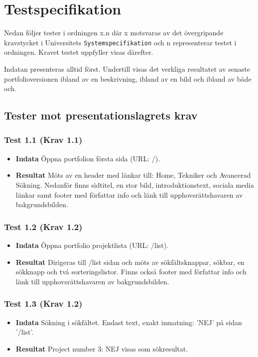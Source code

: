 \documentclass{TDP003mall}
\begin{document}
\section{Testspecifikation}
Nedan följer tester i ordningen x.n där x motsvaras av det övergripande kravstycket i Universitets \texttt{Systemspecifikation} och n representerar testet i ordningen. Kravet testet uppfyller visas därefter.

Indatan presenteras alltid först. Undertill visas det verkliga resultatet av senaste portfolioversionen ibland av en beskrivning, ibland av en bild och ibland av både och.
\subsection{Tester mot presentationslagrets krav}
\subsubsection*{Test 1.1 (Krav 1.1)}
\begin{itemize}
\item[]\textbf{Indata} Öppna portfolion första sida (URL: /).
\item[]\textbf{Resultat} Möts av en header med länkar till: Home, Tekniker och Avancerad Sökning. Nedanför finns sidtitel, en stor bild, introduktionstext, sociala media länkar samt footer med författar info och länk till upphovsrättshavaren av bakgrundsbilden.
\end{itemize}
\subsubsection*{Test 1.2 (Krav 1.2)}
\begin{itemize}
\item[]\textbf{Indata} Öppna portfolio projektlista (URL: /list).
\item[]\textbf{Resultat} Dirigeras till /list sidan och möts av sökfältsknappar, sökbar, en sökknapp och två sorteringslistor. Finns också footer med författar info och länk till upphovsrättshavaren av bakgrundsbilden.
\end{itemize}
\subsubsection*{Test 1.3 (Krav 1.2)}
\begin{itemize}
\item[]\textbf{Indata} Sökning i sökfältet. Endast text, exakt inmatning: 'NEJ' på sidan '/list'.
\item[]\textbf{Resultat} Project number 3: NEJ visas som sökresultat.
\end{itemize} 
\end{document}
